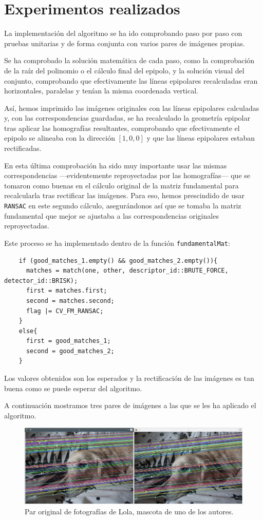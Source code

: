 \documentclass[a4paper, 11pt]{article}
\theoremstyle{definition}
\begin{document}
    \clearpage
    \section{Experimentos realizados}
    La implementación del algoritmo se ha ido comprobando paso por paso con pruebas unitarias y de forma conjunta con varios pares de imágenes propias.

    Se ha comprobado la solución matemática de cada paso, como la comprobación de la raíz del polinomio o el cálculo final del epipolo, y la solución visual del conjunto, comprobando que efectivamente las líneas epipolares recalculadas eran horizontales, paralelas y tenían la misma coordenada vertical.

    Así, hemos imprimido las imágenes originales con las líneas epipolares calculadas y, con las correspondencias guardadas, se ha recalculado la geometría epipolar tras aplicar las homografías resultantes, comprobando que efectivamente el epipolo se alineaba con la dirección $[1, 0, 0]$ y que las líneas epipolares estaban rectificadas.

    En esta última comprobación ha sido muy importante usar las mismas correspondencias ---evidentemente reproyectadas por las homografías--- que se tomaron como buenas en el cálculo original de la matriz fundamental  para recalcularla tras rectificar las imágenes. Para eso, hemos prescindido de usar \lstinline{RANSAC} en este segundo cálculo, asegurándonos así que se tomaba la matriz fundamental que mejor se ajustaba a las correspondencias originales reproyectadas.

    Este proceso se ha implementado dentro de la función \lstinline{fundamentalMat}:
    \begin{lstlisting}
    if (good_matches_1.empty() && good_matches_2.empty()){
      matches = match(one, other, descriptor_id::BRUTE_FORCE, detector_id::BRISK);
      first = matches.first;
      second = matches.second;
      flag |= CV_FM_RANSAC;
    }
    else{
      first = good_matches_1;
      second = good_matches_2;
    }
    \end{lstlisting}

    Los valores obtenidos son los esperados y la rectificación de las imágenes es tan buena como se puede esperar del algoritmo.

    A continuación mostramos tres pares de imágenes a las que se les ha aplicado el algoritmo.

    \begin{figure}[ht!]
    	\centering
    	\includegraphics[width=160mm]{Lola-Normal.png}
    	\caption{Par original de fotografías de Lola, mascota de uno de los autores.}
    \end{figure}
\end{document}
